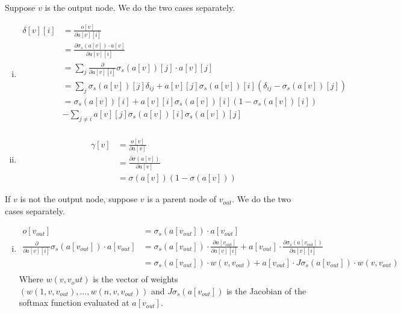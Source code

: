 \documentclass{amsart}
\theoremstyle{definition}
\begin{document}
\begin{enumerate}[(a)]
    Suppose $v$ is the output node. We do the two cases separately.
    \begin{enumerate}[i.]
      \item 
        \begin{align*}
          \delta[v][i] &= \frac{o[v]}{\partial a[v][i]} \\
          &= \frac{\partial \sigma_s(a[v]) \cdot a[v]}{\partial a[v][i]}\\
          &= \sum_{j} \frac{\partial}{\partial a[v][i]} \sigma_s(a[v])[j] \cdot a[v][j] \\
          &= \sum_{j} \sigma_s(a[v])[j] \delta_{ij} + a[v][j] \sigma_s(a[v])[i](\delta_{ij} - \sigma_s(a[v])[j]) \\
          &= \sigma_s(a[v])[i] + a[v][i] \sigma_s(a[v])[i](1 - \sigma_s(a[v])[i]) \\
          &- \sum_{j \neq i} a[v][j] \sigma_s(a[v])[i] \sigma_s(a[v])[j] \\
        \end{align*}
      \item 
        \begin{align*}
          \gamma[v] &= \frac{o[v]}{\partial a[v]} \\
          &= \frac{\partial \sigma(a[v])}{\partial a[v]} \\
          &= \sigma(a[v])(1 - \sigma(a[v]))
        \end{align*}
    \end{enumerate}
    If $v$ is not the output node, suppose $v$ is a parent node of $v_{out}$. We do the two cases separately.
    \begin{enumerate}[i.]
      \item 
        \begin{align*}
          o[v_{out}] &= \sigma_s(a[v_{out}]) \cdot a[v_{out}] \\
          \frac{\partial}{\partial a[v][i]} \sigma_s(a[v_{out}]) \cdot a[v_{out}] &= \sigma_s(a[v_{out}]) \cdot \frac{\partial a[v_{out}]}{\partial a[v][i]} + a[v_{out}] \cdot \frac{\partial \sigma_s(a[v_{out}])}{\partial a[v][i]} \\
          &= \sigma_s(a[v_{out}]) \cdot w(v, v_{out}) + a[v_{out}] \cdot J \sigma_s(a[v_{out}]) \cdot w(v, v_{out}) \\
        \end{align*}
        Where $w(v, v_out)$ is the vector of weights $(w(1, v, v_{out}), \ldots, w(n, v, v_{out}))$ and $J \sigma_s(a[v_{out}])$ is the Jacobian of the softmax function evaluated at $a[v_{out}]$.

\end{enumerate}
\end{enumerate}
\end{document}
